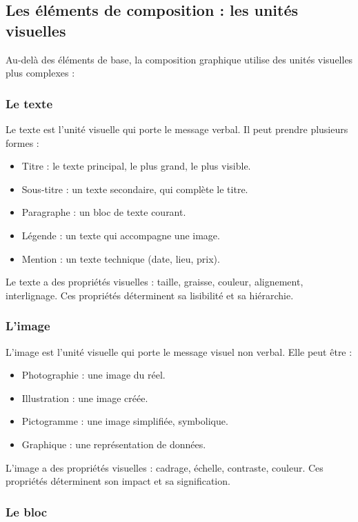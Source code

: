 \subsection{Les éléments de composition : les unités visuelles}

Au-delà des éléments de base, la composition graphique utilise des unités visuelles plus complexes :

\subsubsection{Le texte}

Le texte est l'unité visuelle qui porte le message verbal. Il peut prendre plusieurs formes :
\begin{itemize}
  \item Titre : le texte principal, le plus grand, le plus visible.
  \item Sous-titre : un texte secondaire, qui complète le titre.
  \item Paragraphe : un bloc de texte courant.
  \item Légende : un texte qui accompagne une image.
  \item Mention : un texte technique (date, lieu, prix).
\end{itemize}

Le texte a des propriétés visuelles : taille, graisse, couleur, alignement, interlignage. Ces propriétés déterminent sa lisibilité et sa hiérarchie.

\subsubsection{L'image}

L'image est l'unité visuelle qui porte le message visuel non verbal. Elle peut être :
\begin{itemize}
  \item Photographie : une image du réel.
  \item Illustration : une image créée.
  \item Pictogramme : une image simplifiée, symbolique.
  \item Graphique : une représentation de données.
\end{itemize}

L'image a des propriétés visuelles : cadrage, échelle, contraste, couleur. Ces propriétés déterminent son impact et sa signification.

\subsubsection{Le bloc}

